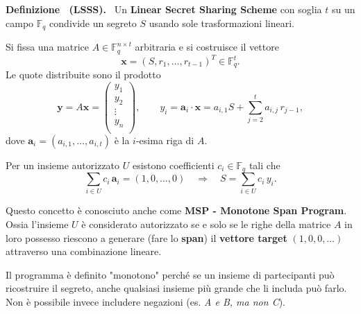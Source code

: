 \documentclass[a4paper, 11pt]{article}
\newenvironment{definition}[1][]{
  \par\noindent\textbf{Definizione%
  \if\relax\detokenize{#1}\relax\else\ (\textbf{#1})\fi.}\ }{}
\begin{document}
\begin{definition}[LSSS]
    Un \textbf{Linear Secret Sharing Scheme} con soglia $t$ su un campo $\mathbb{F}_q$ condivide un segreto $S$ usando sole trasformazioni lineari.

    Si fissa una matrice $A \in \mathbb{F}_q^{n \times t}$ arbitraria e si costruisce il vettore
    \[
        \mathbf{x} = (S, r_1, \dots, r_{t-1})^T \in \mathbb{F}_q^{t}.
    \]
    Le quote distribuite sono il prodotto
    \[
        \mathbf{y} = A\mathbf{x} =
        \begin{pmatrix}
        y_1 \\
        y_2 \\
        \vdots \\   
        y_n \\
        \end{pmatrix},
        \qquad
        y_i = \mathbf{a}_i \cdot \mathbf{x}
        = a_{i,1} S + \sum_{j=2}^{t} a_{i,j}\, r_{j-1},
    \]
    dove $\mathbf{a}_i = (a_{i,1}, \dots, a_{i,t})$ è la $i$-esima riga di $A$.

    Per un insieme autorizzato $U$ esistono coefficienti $c_i \in \mathbb{F}_q$ tali che
    \[
        \sum_{i \in U} c_i\, \mathbf{a}_i = (1, 0, \dots, 0)
        \quad\Rightarrow\quad
        S = \sum_{i \in U} c_i\, y_i.
    \]

    Questo concetto è conosciuto anche come \textbf{MSP - Monotone Span Program}. Ossia l'insieme $U$ è considerato autorizzato se e solo se le righe della matrice $A$ in loro possesso riescono a generare (fare lo \textbf{span}) il \textbf{vettore target} $(1, 0, 0, \dots)$ attraverso una combinazione lineare. 
    
    Il programma è definito "monotono" perché se un insieme di partecipanti può ricostruire il segreto, anche qualsiasi insieme più grande che li includa può farlo. Non è possibile invece includere negazioni (es. \textit{A e B, ma non C}).

\end{definition}
\end{document}
